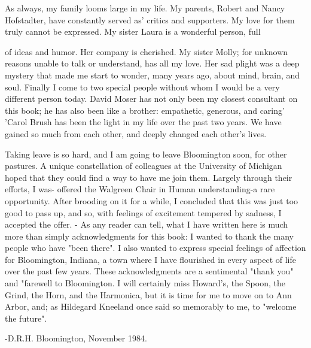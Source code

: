        As always, my family looms large in my life. My parents, Robert and Nancy
Hofstadter, have constantly served as' critics and supporters. My love for them truly
cannot be expressed. My sister Laura is a wonderful person, full





of ideas and humor. Her company is cherished. My sister Molly; for unknown reasons
unable to talk or understand, has all my love. Her sad plight was a deep mystery that
made me start to wonder, many years ago, about mind, brain, and soul.
        Finally I come to two special people without whom I would be a very different
person today. David Moser has not only been my closest consultant on this book; he
has also been like a brother: empathetic, generous, and caring' 'Carol Brush has been
the light in my life over the past two years. We have gained so much from each other,
and deeply changed each other's lives.

        Taking leave is so hard, and I am going to leave Bloomington soon, for other
pastures. A unique constellation of colleagues at the University of Michigan hoped
that they could find a way to have me join them. Largely through their efforts, I was-
offered the Walgreen Chair in Human understanding-a rare opportunity. After
brooding on it for a while, I concluded that this was just too good to pass up, and so,
with feelings of excitement tempered by sadness, I accepted the offer.     -
        As any reader can tell, what I have written here is much more than simply
acknowledgments for this book: I wanted to thank the many people who have "been
there". I also wanted to express special feelings of affection for Bloomington, Indiana,
a town where I have flourished in every aspect of life over the past few years. These
acknowledgments are a sentimental "thank you" and "farewell to Bloomington. I will
certainly miss Howard's, the Spoon, the Grind, the Horn, and the Harmonica, but it is
time for me to move on to Ann Arbor, and; as Hildegard Kneeland once said so
memorably to me, to "welcome the future".

                                                                           -D.R.H.
                                                        Bloomington, November 1984.





